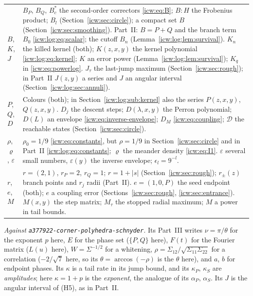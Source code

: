\documentclass[11pt,letterpaper]{article}
\theoremstyle{remark}\newtheorem{remark}[theorem]{Remark}
\newcommand{\eps}{\varepsilon}
\newcommand{\1}{\mathbf1}
\newcommand{\file}[1]{\textup{\nolinkurl{#1}}}
\begin{document}
\begin{longtable}{@{}>{\raggedright\arraybackslash}p{} >{\raggedright\arraybackslash}p{}@{}}
$B$, $K$, $J$ & $B_P$, $B_Q$, $B^*_c$ the second-order correctors \eqref{icw:eq:B}; $B:H$ the Frobenius product; $B_l$ (Section~\ref{icw:sec:circle}); a compact set $B$ (Section~\ref{icw:sec:smoothing}). Part~II: $B=P+Q$ and the branch term $B_0$ \eqref{icw:log:eq:scalar}; the cutoff $B_n$ (Lemma~\ref{icw:log:lem:survival}). $K_n$ the killed kernel (both); $K(z,x,y)$ the kernel polynomial \eqref{icw:log:eq:kernel}; $K$ an error power (Lemma~\ref{icw:log:lem:survival}); $K_q$ in \eqref{icw:eq:powerlog}. $J_\tau$ the last-jump maximum (Section~\ref{icw:sec:rough}); in Part~II $J(z,y)$ a series and $J$ an angular interval (Section~\ref{icw:log:sec:annuli}).\\
$P$, $Q$, $D$ & Colours (both); in Section~\ref{icw:log:sub:kernel} also the series $P(z,x,y)$, $Q(z,x,y)$. $D_j$ the descent steps; $D(\lambda,x,y)$ the Perron polynomial; $D(L)$ an envelope \eqref{icw:eq:inverse-envelope}; $D_M$ \eqref{icw:eq:coupling}; $\mathcal D$ the reachable states (Section~\ref{icw:sec:circle}).\\
$\rho$, $\varrho$, $\eps$ & $\rho_0=1/9$ \eqref{icw:eq:constants}, but $\rho=1/9$ in Section~\ref{icw:sec:circle} and in Part~II \eqref{icw:log:eq:constants}; $\varrho$ the meander density \eqref{icw:eq:I1}. $\eps$ several small numbers, $\eps(y)$ the inverse envelope; $\epsilon_l=9^{-l}$.\\
$r$, $e$, $M$ & $r=(2,1)$, $r_P=2$, $r_Q=1$; $r=1+|s|$ (Section~\ref{icw:sec:rough}); $r_\pm(z)$ branch points and $r_j$ radii (Part~II). $e=(1,0,P)$ the seed endpoint (both); $e$ a coupling error (Sections~\ref{icw:sec:rough}, \ref{icw:sec:entrance}). $M(x,y)$ the step matrix; $M_\tau$ the stopped radial maximum; $M$ a power in tail bounds.\\
\bottomrule
\end{longtable}
\endgroup

\emph{Against \file{a377922-corner-polyhedra-schnyder}.} Its Part~III writes $\nu=\pi/\theta$ for the exponent $p$ here, $E$ for the phase set ($\{P,Q\}$ here), $F(t)$ for the Fourier matrix ($L(u)$ here), $W=\Sigma^{-1/2}$ for a whitening, $\rho=\Sigma_{12}/\sqrt{\Sigma_{11}\Sigma_{22}}$ for a correlation ($-2/\sqrt7$ here, so its $\theta=\arccos(-\rho)$ is the $\theta$ here), and $a$, $b$ for endpoint phases. Its $\kappa$ is a tail rate in its jump bound, and its $\kappa_P$, $\kappa_S$ are \emph{amplitudes}; here $\kappa=1+p$ is the \emph{exponent}, the analogue of its $\alpha_P$, $\alpha_S$. Its $J$ is the angular interval of (H5), as in Part~II.
\end{document}
